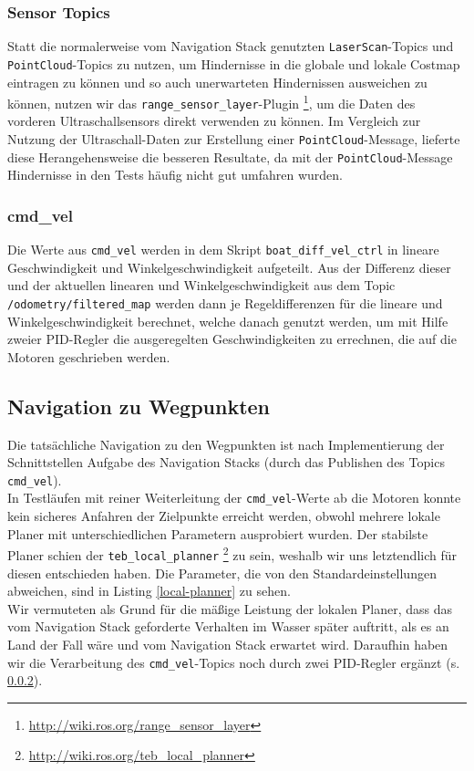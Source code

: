 \documentclass[11pt]{article}
\begin{document}
\subsubsection{Sensor Topics} \label{sensor-topics}
Statt die normalerweise vom Navigation Stack genutzten \texttt{LaserScan}-Topics und \texttt{PointCloud}-Topics zu nutzen, um Hindernisse in die globale und lokale Costmap eintragen zu können und so auch unerwarteten Hindernissen ausweichen zu können, nutzen wir das \texttt{range\_sensor\_layer}-Plugin \footnote{\url{http://wiki.ros.org/range_sensor_layer}}, um die Daten des vorderen Ultraschallsensors direkt verwenden zu können. Im Vergleich zur Nutzung der Ultraschall-Daten zur Erstellung einer \texttt{PointCloud}-Message, lieferte diese Herangehensweise die besseren Resultate, da mit der \texttt{PointCloud}-Message Hindernisse in den Tests häufig nicht gut umfahren wurden.

\subsubsection{cmd\_vel} \label{cmd}
Die Werte aus \texttt{cmd\_vel} werden in dem Skript \texttt{boat\_diff\_vel\_ctrl} in lineare Geschwindigkeit und Winkelgeschwindigkeit aufgeteilt. Aus der Differenz dieser und der aktuellen linearen und Winkelgeschwindigkeit aus dem Topic \texttt{/odometry/filtered\_map} werden dann je Regeldifferenzen für die lineare und Winkelgeschwindigkeit berechnet, welche danach genutzt werden, um mit Hilfe zweier PID-Regler die ausgeregelten Geschwindigkeiten zu errechnen, die auf die Motoren geschrieben werden.

\subsection{Navigation zu Wegpunkten}

Die tatsächliche Navigation zu den Wegpunkten ist nach Implementierung der Schnittstellen Aufgabe des Navigation Stacks (durch das Publishen des Topics \texttt{cmd\_vel}).\\
In Testläufen mit reiner Weiterleitung der \texttt{cmd\_vel}-Werte ab die Motoren konnte kein sicheres Anfahren der Zielpunkte erreicht werden, obwohl mehrere lokale Planer mit unterschiedlichen Parametern ausprobiert wurden. Der stabilste Planer schien der \texttt{teb\_local\_planner} \footnote{\url{http://wiki.ros.org/teb_local_planner}} zu sein, weshalb wir uns letztendlich für diesen entschieden haben. Die Parameter, die von den Standardeinstellungen abweichen, sind in Listing \ref{local-planner} zu sehen.\\

Wir vermuteten als Grund für die mäßige Leistung der lokalen Planer, dass das vom Navigation Stack geforderte Verhalten im Wasser später auftritt, als es an Land der Fall wäre und vom Navigation Stack erwartet wird. Daraufhin haben wir die Verarbeitung des \texttt{cmd\_vel}-Topics noch durch zwei PID-Regler ergänzt (s. \ref{cmd}).
\end{document}

